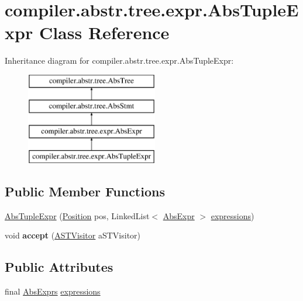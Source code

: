 \hypertarget{classcompiler_1_1abstr_1_1tree_1_1expr_1_1_abs_tuple_expr}{}\section{compiler.\+abstr.\+tree.\+expr.\+Abs\+Tuple\+Expr Class Reference}
\label{classcompiler_1_1abstr_1_1tree_1_1expr_1_1_abs_tuple_expr}
Inheritance diagram for compiler.\+abstr.\+tree.\+expr.\+Abs\+Tuple\+Expr\+:\begin{figure}[H]
\begin{center}
\leavevmode
\includegraphics[height=4.000000cm]{classcompiler_1_1abstr_1_1tree_1_1expr_1_1_abs_tuple_expr}
\end{center}
\end{figure}
\subsection*{Public Member Functions}
\begin{DoxyCompactItemize}
\item 
\hyperlink{classcompiler_1_1abstr_1_1tree_1_1expr_1_1_abs_tuple_expr_a4ee5fcd6edb36f4ed91fb6250d1b4997}{Abs\+Tuple\+Expr} (\hyperlink{classcompiler_1_1_position}{Position} pos, Linked\+List$<$ \hyperlink{classcompiler_1_1abstr_1_1tree_1_1expr_1_1_abs_expr}{Abs\+Expr} $>$ \hyperlink{classcompiler_1_1abstr_1_1tree_1_1expr_1_1_abs_tuple_expr_a2914b1e474a0a2013b798297e1fc4be3}{expressions})
\item 
\mbox{\label{classcompiler_1_1abstr_1_1tree_1_1expr_1_1_abs_tuple_expr_a0a89fde38b2aa24d9af3f9e4a5dc35e1}} 
void {\bfseries accept} (\hyperlink{interfacecompiler_1_1abstr_1_1_a_s_t_visitor}{A\+S\+T\+Visitor} a\+S\+T\+Visitor)
\end{DoxyCompactItemize}
\subsection*{Public Attributes}
\begin{DoxyCompactItemize}
\item 
final \hyperlink{classcompiler_1_1abstr_1_1tree_1_1_abs_exprs}{Abs\+Exprs} \hyperlink{classcompiler_1_1abstr_1_1tree_1_1expr_1_1_abs_tuple_expr_a2914b1e474a0a2013b798297e1fc4be3}{expressions}
\end{DoxyCompactItemize}


